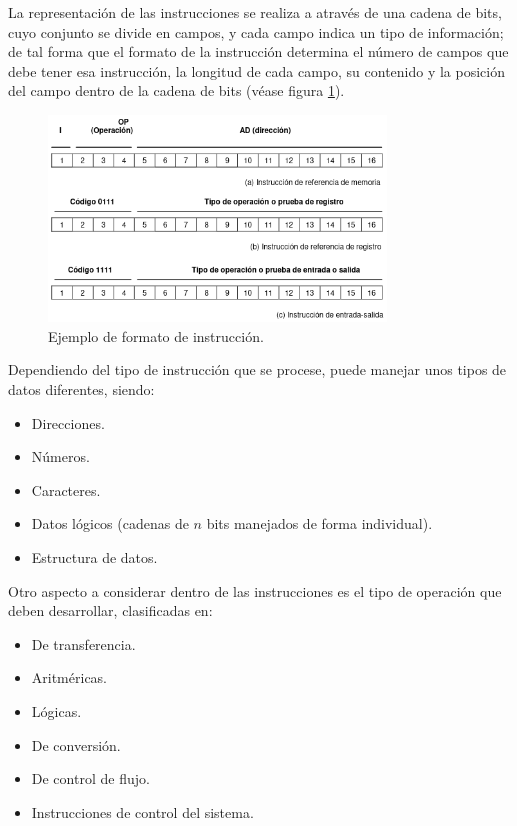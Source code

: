\documentclass[a4paper, 11pt, titlepage]{article}
\begin{document}
            La representación de las instrucciones se realiza a através de una cadena de bits, cuyo conjunto se 
            divide en campos, y cada campo indica un tipo de información; de tal forma que el formato de la 
            instrucción determina el número de campos que debe tener esa instrucción, la longitud de cada campo, 
            su contenido y la posición del campo dentro de la cadena de bits (véase figura \ref{formatoinstruccion}).

            \begin{figure}[htp]
                \centering
                \includegraphics[width=0.8\textwidth]{resources/formatoinstruccion.png}
                \caption{Ejemplo de formato de instrucción.}
                \label{formatoinstruccion}
            \end{figure}

            Dependiendo del tipo de instrucción que se procese, puede manejar unos tipos de datos diferentes, siendo:

            \begin{itemize}
                \item Direcciones.
                \item Números.
                \item Caracteres.
                \item Datos lógicos (cadenas de $n$ bits manejados de forma individual).
                \item Estructura de datos.
            \end{itemize}

            Otro aspecto a considerar dentro de las instrucciones es el tipo de operación que deben desarrollar, 
            clasificadas en:

            \begin{itemize}
                \item De transferencia.
                \item Aritméricas.
                \item Lógicas.
                \item De conversión.
                \item De control de flujo.
                \item Instrucciones de control del sistema.
            \end{itemize}
\end{document}
